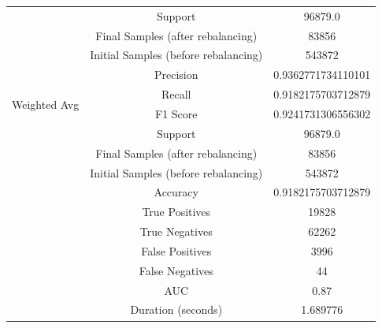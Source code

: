 \begin{longtable}{|c|c|c|}
 & Support & 96879.0 \\
 & Final Samples (after rebalancing) & 83856 \\
 & Initial Samples (before rebalancing) & 543872 \\
\hline
\multirow{4}{*}{Weighted Avg} & Precision & 0.9362771734110101 \\
 & Recall & 0.9182175703712879 \\
 & F1 Score & 0.9241731306556302 \\
 & Support & 96879.0 \\
 & Final Samples (after rebalancing) & 83856 \\
 & Initial Samples (before rebalancing) & 543872 \\
\hline
& Accuracy & 0.9182175703712879 \\ \hline
& True Positives & 19828 \\ \hline
& True Negatives & 62262 \\ \hline
& False Positives & 3996 \\ \hline
& False Negatives & 44 \\ \hline
& AUC & 0.87 \\ \hline
& Duration (seconds) & 1.689776 \\ \hline
\end{longtable}


